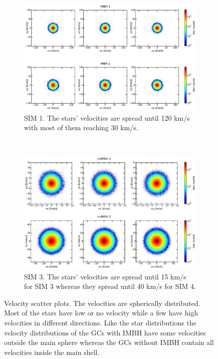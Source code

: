 \begin{figure}[htbp] 
\centering
\begin{subfigure}{0.95\textwidth}
	\centering
  	\includegraphics[width=\textwidth]{Plots/velocity_scatter_IMBH.pdf}
  	\caption{SIM 1. The stars' velocities are spread until 120 km/s with most of them reaching 30 km/s.}
 	\label{fig:vel_scat_IMBH}
\end{subfigure}
\\
\begin{subfigure}{0.95\textwidth}
	\centering
  	\includegraphics[width=\textwidth]{Plots/velocity_scatter_noIMBH.pdf}
  	\caption{SIM 3. The stars' velocities are spread until 15 km/s for SIM 3 whereas they spread until 40 km/s for SIM 4.}
 	\label{fig:vel_scat_noIMBH}
\end{subfigure}

\caption{Velocity scatter plots. The velocities are spherically distributed. Most of the stars have low or no velocity while a few have high velocities in different directions. Like the star distributions the velocity distributions of the \acp{GC} with \ac{IMBH} have some velocities outside the main sphere whereas the \acp{GC} without \ac{IMBH} contain all velocities inside the main shell.}
\label{fig:velocity_scatter}
\end{figure}
